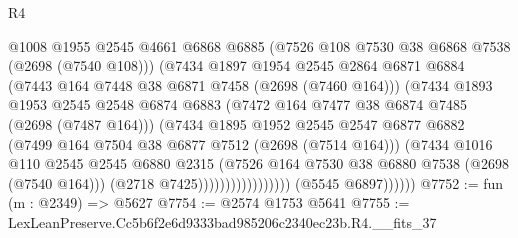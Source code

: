 \begin{lexlean}{R4}
\begin{coremodule}
                                      @1008
                                      @1955
                                      @2545
                                      @4661
                                      @6868
                                      @6885
                                      (@7526 @108 @7530 @38 @6868 @7538 (@2698 (@7540 @108)))
                                      (@7434
                                        @1897
                                        @1954
                                        @2545
                                        @2864
                                        @6871
                                        @6884
                                        (@7443 @164 @7448 @38 @6871 @7458 (@2698 (@7460 @164)))
                                        (@7434
                                          @1893
                                          @1953
                                          @2545
                                          @2548
                                          @6874
                                          @6883
                                          (@7472 @164 @7477 @38 @6874 @7485 (@2698 (@7487 @164)))
                                          (@7434
                                            @1895
                                            @1952
                                            @2545
                                            @2547
                                            @6877
                                            @6882
                                            (@7499 @164 @7504 @38 @6877 @7512 (@2698 (@7514 @164)))
                                            (@7434
                                              @1016
                                              @110
                                              @2545
                                              @2545
                                              @6880
                                              @2315
                                              (@7526
                                                @164
                                                @7530
                                                @38
                                                @6880
                                                @7538
                                                (@2698 (@7540 @164)))
                                              (@2718 @7425)))))))))))))))))
              (@5545 @6897))))))
@7752 := fun (m : @2349) => @5627
@7754 := @2574 @1753 @5641
@7755 := LexLeanPreserve.Cc5b6f2e6d9333bad985206c2340ec23b.R4.__fits_37

\end{coremodule}
\end{lexlean}

